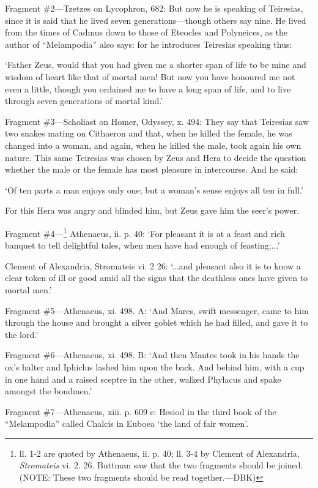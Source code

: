 Fragment \#2—Tzetzes on Lycophron, 682: But now he is speaking of
Teiresias, since it is said that he lived seven generations—though others
say nine. He lived from the times of Cadmus down to those of Eteocles and
Polyneices, as the author of “Melampodia” also says: for he
introduces Teiresias speaking thus:

‘Father Zeus, would that you had given me a shorter span of life to be
mine and wisdom of heart like that of mortal men! But now you have honoured me
not even a little, though you ordained me to have a long span of life, and to
live through seven generations of mortal kind.’

Fragment \#3—Scholiast on Homer, Odyssey, x. 494: They say that Teiresias
saw two snakes mating on Cithaeron and that, when he killed the female, he was
changed into a woman, and again, when he killed the male, took again his own
nature. This same Teiresias was chosen by Zeus and Hera to decide the question
whether the male or the female has most pleasure in intercourse. And he said:

‘Of ten parts a man enjoys only one; but a woman’s sense enjoys all
ten in full.’

For this Hera was angry and blinded him, but Zeus gave him the seer’s
power.

Fragment \#4—\footnote{ll. 1-2 are quoted by
Athenaeus, ii. p. 40; ll. 3-4 by Clement of Alexandria, \emph{Stromateis} vi.
2. 26. Buttman saw that the two fragments should be joined. (NOTE: These two
fragments should be read together.—DBK)} Athenaeus, ii. p. 40: ‘For
pleasant it is at a feast and rich banquet to tell delightful tales, when men
have had enough of feasting;...’

Clement of Alexandria, Stromateis vi. 2 26: ‘...and pleasant also it is
to know a clear token of ill or good amid all the signs that the deathless ones
have given to mortal men.’

Fragment \#5—Athenaeus, xi. 498. A: ‘And Mares, swift messenger,
came to him through the house and brought a silver goblet which he had filled,
and gave it to the lord.’

Fragment \#6—Athenaeus, xi. 498. B: ‘And then Mantes took in his
hands the ox’s halter and Iphiclus lashed him upon the back. And behind
him, with a cup in one hand and a raised sceptre in the other, walked Phylacus
and spake amongst the bondmen.’

Fragment \#7—Athenaeus, xiii. p. 609 e: Hesiod in the third book of the
“Melampodia” called Chalcis in Euboea ‘the land of fair
women’.

